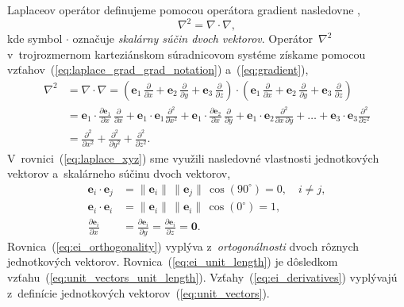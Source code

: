 \documentclass[a4paper,12pt]{book}
\let\vec\mathbf
\begin{document}
Laplaceov operátor definujeme pomocou operátora gradient nasledovne
\parencite{SansoGeoidDetermination},
%
\begin{equation}
\label{eq:laplace_grad_grad_notation}
\nabla^2 = \nabla \cdot \nabla{,}
\end{equation}
%
kde symbol $\cdot$ označuje \emph{skalárny súčin dvoch vektorov}.  
Operátor~$\nabla^2$ v~trojrozmernom karteziánskom súradnicovom systéme získame 
pomocou vzťahov~(\ref{eq:laplace_grad_grad_notation}) a~(\ref{eq:gradient}),
%
\begin{equation}
\label{eq:laplace_xyz}
\begin{split}
\nabla^2 &= \nabla \cdot \nabla = \left( \vec e_1 \, \frac{\partial}{\partial 
x} + \vec e_2 \, \frac{\partial}{\partial y} + \vec e_3 \, 
\frac{\partial}{\partial z} \right) \cdot \left( \vec e_1 \, 
\frac{\partial}{\partial x} + \vec e_2 \, \frac{\partial}{\partial y} + \vec 
e_3 \, \frac{\partial}{\partial z} \right)\\
%
&=\vec e_1 \cdot \frac{\partial \vec e_1}{\partial x} \, 
\frac{\partial}{\partial x} + \vec e_1 \cdot \vec e_1 
\frac{\partial^2}{\partial x^2} + \vec e_1 \cdot \frac{\partial \vec 
e_2}{\partial x} \, \frac{\partial}{\partial y} + \vec e_1 \cdot \vec e_2 
\frac{\partial^2}{\partial x \, \partial y} + \dots + \vec e_3 \cdot \vec e_3 
\frac{\partial^2}{\partial z^2}\\
%
&=\frac{\partial^2}{\partial x^2} + \frac{\partial^2}{\partial y^2} 
+ \frac{\partial^2}{\partial z^2}{.}
\end{split}
\end{equation}
%
V~rovnici~(\ref{eq:laplace_xyz}) sme využili nasledovné vlastnosti 
jednotkových vektorov a~skalárneho súčinu dvoch vektorov,
%
\begin{align}
\label{eq:ei_orthogonality}
\vec e_i \cdot \vec e_j &= \| \vec e_i \| \, \| \vec e_j \| \, \cos(90^\circ) 
= 0{,} \quad i \neq j{,}\\
%
\label{eq:ei_unit_length}
\vec e_i \cdot \vec e_i &= \| \vec e_i \| \, \| \vec e_i \| \, \cos(0^\circ) 
= 1{,}\\
%
\label{eq:ei_derivatives}
\frac{\partial \vec e_i}{\partial x} &= \frac{\partial \vec e_i}{\partial y} 
= \frac{\partial \vec e_i}{\partial z} = \vec 0{.}
\end{align}
%
Rovnica~(\ref{eq:ei_orthogonality}) vyplýva z~\emph{ortogonálnosti} dvoch 
rôznych jednotkových vektorov.  Rovnica~(\ref{eq:ei_unit_length}) je dôsledkom 
vzťahu~(\ref{eq:unit_vectors_unit_length}).  Vzťahy~(\ref{eq:ei_derivatives}) 
vyplývajú z~definície jednotkových vektorov~(\ref{eq:unit_vectors}).
\end{document}
